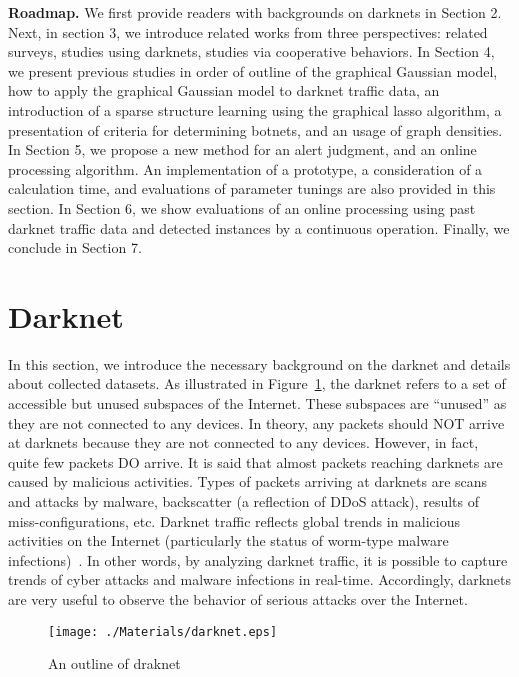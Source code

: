 \documentclass{sig-alternate-10pt}
\begin{document}
\vspace*{0.3 cm}
\noindent
\textbf{Roadmap.}\space\space
We first provide readers with backgrounds on darknets in Section 2.
Next, in section 3, we introduce related works from three perspectives: related surveys, studies using darknets, studies via cooperative behaviors.
In Section 4, we present previous studies in order of outline of the graphical Gaussian model, how to apply the graphical Gaussian model to darknet traffic data, an introduction of a sparse structure learning using the graphical lasso algorithm, a presentation of criteria for determining botnets, and an usage of graph densities.
In Section 5, we propose a new method for an alert judgment, and an online processing algorithm.
An implementation of a prototype, a consideration of a calculation time, and evaluations of parameter tunings are also provided in this section.
In Section 6, we show evaluations of an online processing using past darknet traffic data and detected instances by a continuous operation.
Finally, we conclude in Section 7.

\section{Darknet}
In this section, we introduce the necessary background on the darknet and details about collected datasets.
As illustrated in Figure~\ref{fig:darknet}, the darknet refers to a set of accessible but unused subspaces of the Internet.
These subspaces are ``unused” as they are not connected to any devices.
In theory, any packets should NOT arrive at darknets because they are not connected to any devices.
However, in fact, quite few packets DO arrive.
It is said that almost packets reaching darknets are caused by malicious activities.
Types of packets arriving at darknets are scans and attacks by malware, backscatter (a reflection of DDoS attack), results of miss-configurations, etc.
Darknet traffic reflects global trends in malicious activities on the Internet (particularly the status of worm-type malware infections)~\cite{CyberLab}.
In other words, by analyzing darknet traffic, it is possible to capture trends of cyber attacks and malware infections in real-time.
Accordingly, darknets are very useful to observe the behavior of serious attacks over the Internet.


\begin{figure}[tb]
\begin{center}
	\texttt{[image: ./Materials/darknet.eps]}
	\caption{An outline of draknet}
  	\label{fig:darknet}
\end{center}
\end{figure}
\end{document}
